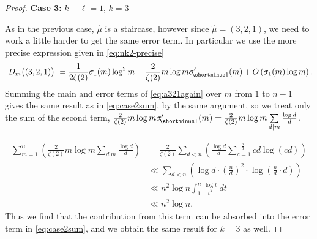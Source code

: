 \documentclass{article}
\theoremstyle{plain}
\theoremstyle{definition}
\begin{document}
\begin{proof}
\medskip
\noindent\textbf{Case 3:} $k-\ell = 1$, $k=3$
\medskip

As in the previous case, $\hat \mu$ is a staircase, however since $\hat \mu=(3,2,1)$, we need to work a little harder to get the same error term. In particular we use the more precise expression given in \eqref{eq:nk2-precise}
\begin{align}
    \left|D_m\big((3,2,1)\big)\right| =\frac{1}{2\zeta(2)}\sigma_{1}(m)\log^2 m-\frac{2}{\zeta(2)} m \log m \sigma_{\hspace{-0.7mm}\shortminus 1} '(m) + O\left(\sigma_1(m) \log m\right). \label{eq:a321again}
\end{align}
Summing the main and error terms of \eqref{eq:a321again} over $m$ from $1$ to $n{-}1$ gives the same result as in \eqref{eq:case2sum}, by the same argument, so we treat only the sum of the second term, $\frac{2}{\zeta(2)} m \log m \sigma_{\hspace{-0.7mm}\shortminus 1} '(m) = \frac{2}{\zeta(2)} m \log m \sum\limits_{d|m} \frac{\log d}{d}$. 

\begin{align*}
    \sum_{m=1}^{n} \left(\frac{2}{\zeta(2)} m \log m \sum_{d|m} \frac{\log d}{d}\right) &= \frac{2}{\zeta(2)}\sum_{d<n}\left( \frac{\log d}{d} \sum_{c=1}^{\left\lfloor\frac{n}{d} \right \rfloor} cd \log(cd)\right)\\
    &\ll \sum_{d<n}\left(\log d \cdot \left(\frac{n}{d}\right)^2\cdot  \log \left(\frac{n}{d}\cdot d\right)   \right)\\
    &\ll n^2 \log n \int_1^n \frac{\log t}{t^2}\ dt\\
    &\ll n^2 \log n.
\end{align*}
Thus we find that the contribution from this term can be absorbed into the error term in \eqref{eq:case2sum}, and we obtain the same result for $k=3$ as well.
\medskip




\end{proof}
\end{document}
